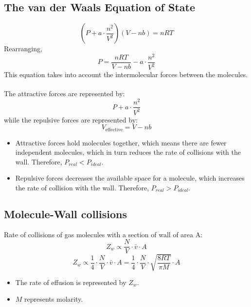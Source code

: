 \documentclass[10pt]{article}
\begin{document}
\subsection*{The van der Waals Equation of State}
\[\left(P + a \cdot \frac{n^2}{V^2}\right)(V - nb) = nRT\]
Rearranging,
\[P = \frac{nRT}{V - nb} - a \cdot \frac{n^2}{V^2}\]
This equation takes into account the intermolecular forces between the molecules.\\\\
The attractive forces are represented by:
\[P + a \cdot \frac{n^2}{V^2}\]
while the repulsive forces are represented by:
\[V_{\text{effective}} = V - nb\]
\begin{itemize}
    \item Attractive forces hold molecules together, which means there are fewer independent molecules, which in turn reduces the rate of collisions with the wall.  Therefore, $P_{real} < P_{ideal}$.
    \item Repulsive forces decreases the available space for a molecule, which increases the rate of collision with the wall.  Therefore, $P_{real} > P_{ideal}$.
\end{itemize}

\subsection*{Molecule-Wall collisions}
Rate of collisions of gas molecules with a section of wall of area A:
\[Z_w \propto \frac{N}{V} \cdot \bar v \cdot A\]
\[Z_w \propto \frac{1}{4} \cdot \frac{N}{V} \cdot \bar v \cdot A = \frac{1}{4} \cdot \frac{N}{V} \cdot \sqrt{\frac{8RT}{\pi M}} \cdot A\]

\begin{itemize}
    \item The rate of effusion is represented by $Z_w$.
    \item $M$ represents molarity.
\end{itemize}
\end{document}
